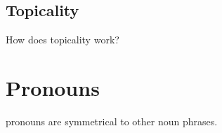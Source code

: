 \subsection{Topicality}
\label{subsec:tvk-nouns-topicality}

How does topicality work?

\section{Pronouns}
\label{sec:tvk-pronouns}

\langtvk{} pronouns are symmetrical to other noun phrases\autocite{wals-50}.
